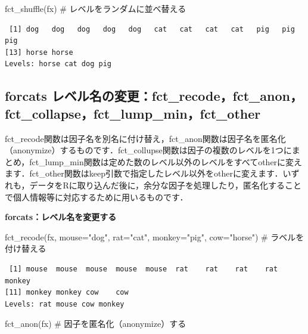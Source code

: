 \documentclass[
  letterpaper,
  DIV=11,
  numbers=noendperiod]{scrreprt}
\newenvironment{Shaded}{\begin{snugshade}}{\end{snugshade}}
\newcommand{\AttributeTok}[1]{\textcolor[rgb]{0.40,0.45,0.13}{#1}}
\newcommand{\CommentTok}[1]{\textcolor[rgb]{0.37,0.37,0.37}{#1}}
\newcommand{\FunctionTok}[1]{\textcolor[rgb]{0.28,0.35,0.67}{#1}}
\newcommand{\NormalTok}[1]{\textcolor[rgb]{0.00,0.23,0.31}{#1}}
\newcommand{\StringTok}[1]{\textcolor[rgb]{0.13,0.47,0.30}{#1}}
\begin{document}
\begin{Shaded}
\begin{Highlighting}[]
\FunctionTok{fct\_shuffle}\NormalTok{(fx) }\CommentTok{\# レベルをランダムに並べ替える}
\end{Highlighting}
\end{Shaded}

\begin{verbatim}
 [1] dog   dog   dog   dog   dog   cat   cat   cat   cat   pig   pig   pig  
[13] horse horse
Levels: horse cat dog pig
\end{verbatim}

\hypertarget{forcats-ux30ecux30d9ux30ebux540dux306eux5909ux66f4fct_recodefct_anonfct_collapsefct_lump_minfct_other}{%
\subsection{forcats
レベル名の変更：fct\_recode，fct\_anon，fct\_collapse，fct\_lump\_min，fct\_other}\label{forcats-ux30ecux30d9ux30ebux540dux306eux5909ux66f4fct_recodefct_anonfct_collapsefct_lump_minfct_other}}

fct\_recode関数は因子名を別名に付け替え，fct\_anon関数は因子名を匿名化（anonymize）するものです．fct\_collupse関数は因子の複数のレベルを1つにまとめ，fct\_lump\_min関数は定めた数のレベル以外のレベルをすべてotherに変えます．fct\_other関数はkeep引数で指定したレベル以外をotherに変えます．いずれも，データをRに取り込んだ後に，余分な因子を処理したり，匿名化することで個人情報等に対応するために用いるものです．

\textbf{forcats：レベル名を変更する}

\begin{Shaded}
\begin{Highlighting}[]
\FunctionTok{fct\_recode}\NormalTok{(fx, }\AttributeTok{mouse=}\StringTok{"dog"}\NormalTok{, }\AttributeTok{rat=}\StringTok{"cat"}\NormalTok{, }\AttributeTok{monkey=}\StringTok{"pig"}\NormalTok{, }\AttributeTok{cow=}\StringTok{"horse"}\NormalTok{) }\CommentTok{\# ラベルを付け替える}
\end{Highlighting}
\end{Shaded}

\begin{verbatim}
 [1] mouse  mouse  mouse  mouse  mouse  rat    rat    rat    rat    monkey
[11] monkey monkey cow    cow   
Levels: rat mouse cow monkey
\end{verbatim}

\begin{Shaded}
\begin{Highlighting}[]
\FunctionTok{fct\_anon}\NormalTok{(fx) }\CommentTok{\# 因子を匿名化（anonymize）する}
\end{Highlighting}
\end{Shaded}
\end{document}
